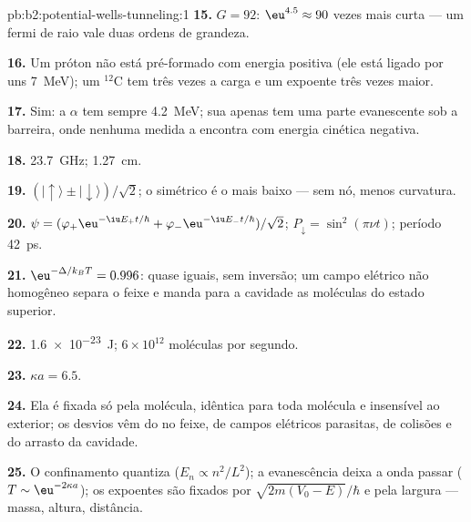 \begin{solution}{pb:b2:potential-wells-tunneling:1}
\textbf{15.} $G = 92$: $\eu^{4.5} \approx 90$ vezes mais curta --- um fermi de raio
vale duas ordens de grandeza.

\textbf{16.} Um próton não está pré-formado com energia positiva (ele está
ligado por uns \qty{7}{MeV}); um $^{12}$C tem três vezes a carga e um
expoente três vezes maior.

\textbf{17.} Sim: a $\alpha$ tem sempre \qty{4.2}{MeV}; sua 
apenas tem uma parte evanescente sob a barreira, onde nenhuma medida
a encontra com energia cinética negativa.

\textbf{18.} \qty{23.7}{GHz}; \qty{1.27}{cm}.

\textbf{19.} $(|{\uparrow}\rangle \pm |{\downarrow}\rangle)/\sqrt2$; o
simétrico é o mais baixo --- sem nó, menos curvatura.

\textbf{20.} $\psi = (\varphi_+\eu^{-\iu E_+t/\hbar} + \varphi_-\eu^{-\iu E_-t/\hbar})/\sqrt2$;
$P_{\downarrow} = \sin^2(\pi\nu t)$; período \qty{42}{ps}.

\textbf{21.} $\eu^{-\Delta/k_BT} = 0.996$: quase iguais, sem inversão; um
campo elétrico não homogêneo separa o feixe e manda para a cavidade as
moléculas do estado superior.

\textbf{22.} \qty{1.6e-23}{J}; $6 \times 10^{12}$ moléculas por segundo.

\textbf{23.} $\kappa a = 6.5$.

\textbf{24.} Ela é fixada só pela molécula, idêntica para toda
molécula e insensível ao exterior; os desvios vêm do
 no feixe, de campos elétricos parasitas, de colisões e
do arrasto da cavidade.

\textbf{25.} O confinamento quantiza ($E_n \propto n^2/L^2$); a evanescência deixa
a onda passar ($T \sim \eu^{-2\kappa a}$); os expoentes são fixados por
$\sqrt{2m(V_0 - E)}/\hbar$ e pela largura --- massa, altura, distância.
\end{solution}
